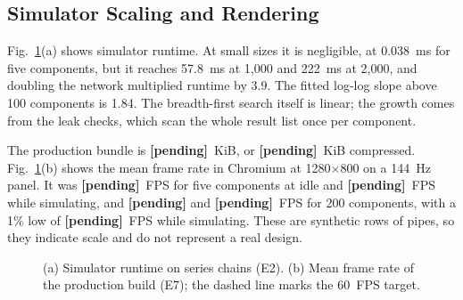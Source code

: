 \documentclass[conference]{IEEEtran}
\newcommand{\scaleFive}{0.038}
\newcommand{\scaleOneK}{57.8}
\newcommand{\scaleTwoK}{222}
\newcommand{\scaleDoubling}{3.9}
\newcommand{\scaleSlope}{1.84}
\newcommand{\framesMissing}{1}
\newcommand{\bundleGzKB}{\textbf{[pending]}}
\newcommand{\bundleKB}{\textbf{[pending]}}
\newcommand{\fpsIdleFive}{\textbf{[pending]}}
\newcommand{\fpsIdleTwoHundred}{\textbf{[pending]}}
\newcommand{\fpsLowTwoHundred}{\textbf{[pending]}}
\newcommand{\fpsSimFive}{\textbf{[pending]}}
\newcommand{\fpsSimTwoHundred}{\textbf{[pending]}}
\begin{document}
\subsection{Simulator Scaling and Rendering}
Fig.~\ref{fig:scale}(a) shows simulator runtime. At small sizes it is negligible, at \scaleFive~ms for five components, but it reaches \scaleOneK~ms at 1,000 and \scaleTwoK~ms at 2,000, and doubling the network multiplied runtime by \scaleDoubling. The fitted log-log slope above 100 components is \scaleSlope. The breadth-first search itself is linear; the growth comes from the leak checks, which scan the whole result list once per component.

The production bundle is \bundleKB~KiB, or \bundleGzKB~KiB compressed. Fig.~\ref{fig:scale}(b) shows the mean frame rate in Chromium at 1280$\times$800 on a 144~Hz panel. It was \fpsIdleFive~FPS for five components at idle and \fpsSimFive~FPS while simulating, and \fpsIdleTwoHundred{} and \fpsSimTwoHundred~FPS for 200 components, with a 1\% low of \fpsLowTwoHundred~FPS while simulating. These are synthetic rows of pipes, so they indicate scale and do not represent a real design.

\begin{figure}[t]
\centering
{}
\caption{(a) Simulator runtime on series chains (E2). (b) Mean frame rate of the production build (E7); the dashed line marks the 60~FPS target.}
\label{fig:scale}
\end{figure}
\end{document}
